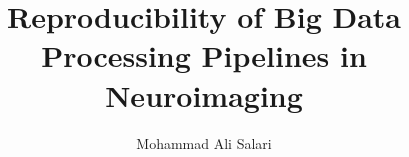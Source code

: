 \author{Mohammad Ali Salari}
\title{Reproducibility of Big Data Processing Pipelines in Neuroimaging}

\PhD                            %
